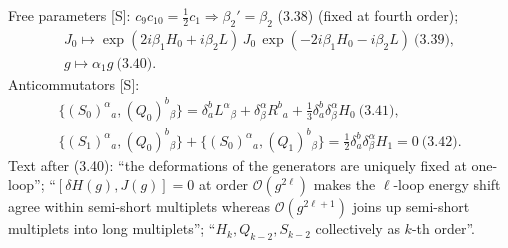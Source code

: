 \documentclass[10pt]{article}
\begin{document}
Free parameters [S]: $c_9c_{10}=\tfrac12c_1\Rightarrow\beta_2'=\beta_2$ (3.38) (fixed at fourth order);
\begin{gather*}
J_0\mapsto\exp(2i\beta_1H_0+i\beta_2L)\,J_0\,\exp(-2i\beta_1H_0-i\beta_2L)\ \text{(3.39)},\\ g\mapsto\alpha_1g\ \text{(3.40)}.
\end{gather*}
Anticommutators [S]:
\begin{gather*}
\{(S_0)^\alpha{}_a,(Q_0)^b{}_\beta\}=\delta^b_aL^\alpha{}_\beta+\delta^\alpha_\beta R^b{}_a+\tfrac13\delta^b_a\delta^\alpha_\beta H_0\ \text{(3.41)},\\ \{(S_1)^\alpha{}_a,(Q_0)^b{}_\beta\}+\{(S_0)^\alpha{}_a,(Q_1)^b{}_\beta\}=\tfrac12\delta^b_a\delta^\alpha_\beta H_1=0\ \text{(3.42)}.
\end{gather*}
Text after (3.40): ``the deformations of the generators are uniquely fixed at one-loop''; ``$[\delta H(g),J(g)]=0$ at order $\mathcal O(g^{2\ell})$ makes the $\ell$-loop energy shift agree within semi-short multiplets whereas $\mathcal O(g^{2\ell+1})$ joins up semi-short multiplets into long multiplets''; ``$H_k,Q_{k-2},S_{k-2}$ collectively as $k$-th order''.
\end{document}
